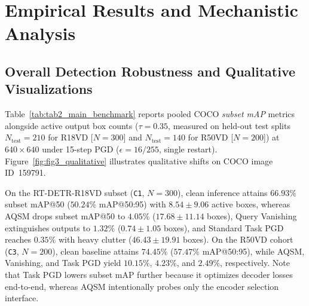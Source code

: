 \documentclass[preprint,10pt]{elsarticle}
\begin{document}

\section{Empirical Results and Mechanistic Analysis}
\label{sec:empirical_results}

\subsection{Overall Detection Robustness and Qualitative Visualizations}
Table~\ref{tab:tab2_main_benchmark} reports pooled COCO \textit{subset mAP} metrics alongside active output box counts ($\tau = 0.35$, measured on held-out test splits $N_{\mathrm{test}} = 210$ for R18VD [$N=300$] and $N_{\mathrm{test}} = 140$ for R50VD [$N=200$]) at $640 \times 640$ under 15-step PGD ($\epsilon = 16/255$, single restart). Figure~\ref{fig:fig3_qualitative} illustrates qualitative shifts on COCO image ID~159791.

On the RT-DETR-R18VD subset (\texttt{C1}, $N=300$), clean inference attains $66.93\%$ subset mAP@50 ($50.24\%$ mAP@50:95) with $8.54 \pm 9.06$ active boxes, whereas AQSM drops subset mAP@50 to $4.05\%$ ($17.68 \pm 11.14$ boxes), Query Vanishing extinguishes outputs to $1.32\%$ ($0.74 \pm 1.05$ boxes), and Standard Task PGD reaches $0.35\%$ with heavy clutter ($46.43 \pm 19.91$ boxes). On the R50VD cohort (\texttt{C3}, $N=200$), clean baseline attains $74.45\%$ ($57.47\%$ mAP@50:95), while AQSM, Vanishing, and Task PGD yield $10.15\%$, $4.23\%$, and $2.49\%$, respectively. Note that Task PGD lowers subset mAP further because it optimizes decoder losses end-to-end, whereas AQSM intentionally probes only the encoder selection interface.
\end{document}

